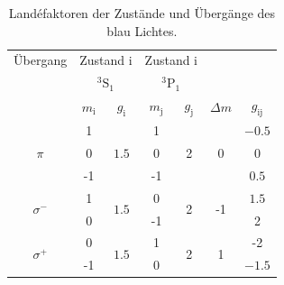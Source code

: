 \begin{table}
    \centering
    \caption{Landéfaktoren der Zustände und Übergänge des blau Lichtes.}
    \label{tab:blauÜber}
    \begin{tabular}{c| c c| c c| c c}
        \toprule
        Übergang&\multicolumn{2}{c|}{Zustand i}&\multicolumn{2}{c|}{Zustand i}&\\
                &\multicolumn{2}{c|}{$^3\text{S}_1$}&\multicolumn{2}{c|}{$^3\text{P}_1$}&\\
        \midrule
        &$m_\text{i}$&$g_\text{i}$&$m_\text{j}$&$g_\text{j}$&$\Delta m $&$g_{\text{ij}}$\\
        \midrule
        \multirow{3}{*}{$\pi$}&1&\multirow{3}{*}{$\num{1.5}$}&1&\multirow{3}{*}{2}&\multirow{3}{*}{0}&$\num{-0.5}$\\
        &0&&0&&&0\\
        &-1&&-1&&&$\num{0.5}$\\
        \hline
        \multirow{2}{*}{$\sigma^-$}&1&\multirow{2}{*}{$\num{1.5}$}&0&\multirow{2}{*}{2}&\multirow{2}{*}{-1}&$\num{1.5}$\\
        &0&&-1&&&2\\
        \hline
        \multirow{2}{*}{$\sigma^+$}&0&\multirow{2}{*}{$\num{1.5}$}&1&\multirow{2}{*}{2}&\multirow{2}{*}{1}&-2\\
        &-1&&0&&&$\num{-1.5}$\\
        \bottomrule
    \end{tabular}
\end{table}
